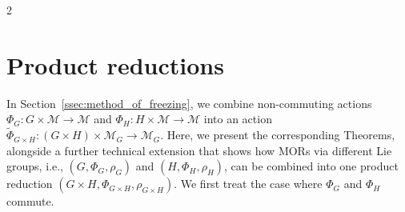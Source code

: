 \documentclass{article}
\newcommand{\M}{\mathcal{M}}                                %
\begin{document}
\begin{multicols}{2}
\section{Product reductions}\label{ssec:MORLie_Products}

In Section~\ref{ssec:method_of_freezing}, we combine non-commuting actions $\Phi_G:G\times\M \rightarrow \M$ and $\Phi_H:H\times\M \rightarrow \M$ into an action $\widetilde{\Phi}_{G\times H}:(G\times H) \times \M_G \rightarrow \M_G$. Here, we present the corresponding Theorems, alongside a further technical extension that shows how MORs via different Lie groups, i.e., $(G,\Phi_G,\rho_G)$ and $(H,\Phi_H,\rho_H)$, can be combined into one product reduction $(G\times H,\Phi_{G\times H},\rho_{G\times H})$. %
We first treat the case where $\Phi_G$ and $\Phi_H$ commute. %


\end{multicols}
\end{document}
